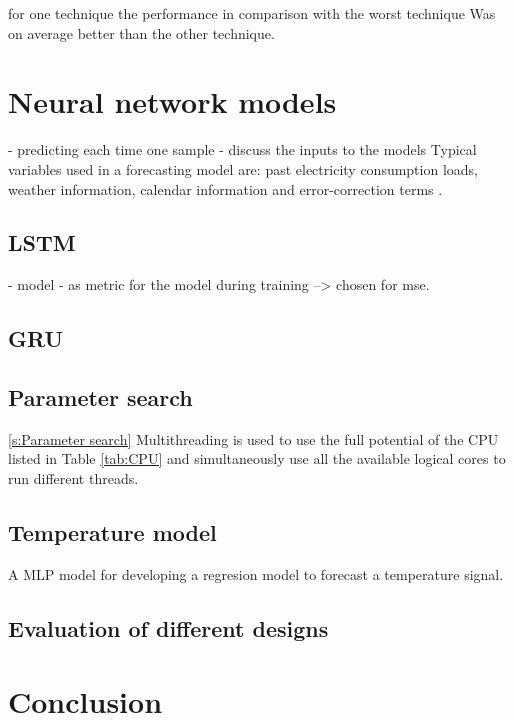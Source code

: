 for one technique the performance in comparison with the worst technique 
Was on average better than the other technique. 


\section{Neural network models}\label{s:Neural network models}
- predicting each time one sample
- discuss the inputs to the models
Typical variables used in a forecasting model are: past electricity consumption loads, weather information, calendar information and error-correction terms \cite{loadforecastingmoor}.
\subsection{LSTM}
- model
- as metric for the model during training --> chosen for mse.


\subsection{GRU}

\subsection{Parameter search} \ref{s:Parameter search}
Multithreading is used to use the full potential of the CPU listed in Table \ref{tab:CPU} and simultaneously use all the available logical cores to run different threads. 

\subsection{Temperature model}
A MLP model for developing a regresion model to forecast a temperature signal. 


\subsection{Evaluation of different designs}


\section{Conclusion}


